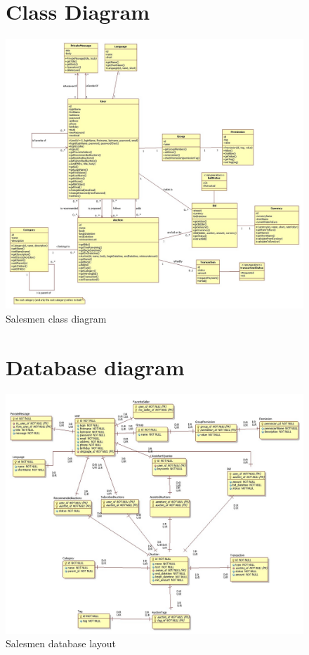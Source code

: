 \documentclass[a4paper, 12pt]{report}
\begin{document}
\begin{figure}
\section{Class Diagram}
\label{fig_class}
\includegraphics[scale=0.4,angle=90]{../../img/class1.jpg}
\caption{Salesmen class diagram}
\end{figure}

\begin{figure}
\section{Database diagram}
\label{fig_database}
\includegraphics[scale=0.5,angle=90]{../../img/erd1.jpg}
\caption{Salesmen database layout}
\end{figure}
\end{document}
